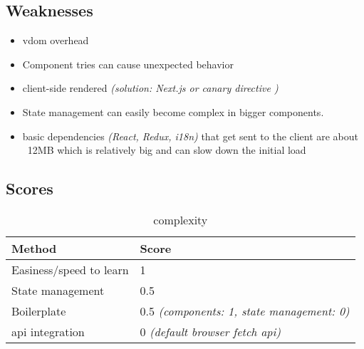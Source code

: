 \subsection{Weaknesses}
\label{subsec:react:weaknesses}
\begin{itemize}
    \item \acrshort{vdom} overhead
    \item Component tries can cause unexpected behavior
    \item client-side rendered \textit{(solution: Next.js or canary  directive \cite{react:use_server_directive})}
    \item State management can easily become complex in bigger components.
    \item basic dependencies \textit{(React, Redux, \acrshort{i18n})} that get sent to the client are about ~12MB which is relatively big and can slow down the initial load
\end{itemize}

\subsection{Scores}
\label{subsec:react:scores}

\begin{table}[H]
    \centering
    \begin{tabular}{|l|l|}
        \hline
        \textbf{Method}            & \textbf{Score}                                    \\
        \hline
        Easiness/speed to learn    & 1                                                 \\ \hline
        State management           & 0.5                                               \\ \hline
        Boilerplate                & 0.5 \textit{(components: 1, state management: 0)} \\ \hline
        \acrshort{api} integration & 0 \textit{(default browser fetch \acrshort{api})} \\ \hline
    \end{tabular}
    \caption{complexity}
    \label{tab:react:complexity}
\end{table}

